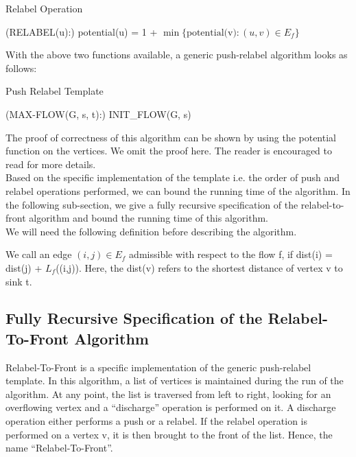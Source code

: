 \documentclass[BTech]{iitmdiss}
\begin{document}
	    \begin{algorithm}[H]
	      \caption{Relabel Operation}
	      
	      \Begin(RELABEL{(u)}:){
		potential(u) =  1 + $\min \{\text{potential(v)} : (u,v) \in E_f \}$ \;
	      }
	    \end{algorithm}
	    
	    With the above two functions available, a generic push-relabel algorithm looks as follows:
	    
	    \begin{algorithm}[H]
	      \caption{Push Relabel Template}
	      
	      \Begin(MAX-FLOW{(G, s, t)}:)
	      {
		INIT\_FLOW(G, s) \;
	      }
	    \end{algorithm}

	    The proof of correctness of this algorithm can be shown by using the potential function on the vertices. We omit the proof here. The 
	    reader is encouraged to read \cite{clrs} for more details. \\
	    	    
	    Based on the specific implementation of the template i.e. the order of push and relabel operations performed, we can bound the running time 
	    of the algorithm. In the following sub-section, we give a fully recursive specification of the relabel-to-front algorithm and bound the 
	    running time of this algorithm. \\
	    
	    We will need the following definition before describing the algorithm.
	    
	    \begin{defn}
	       We call an edge $(i, j) \in E_f$ admissible with respect to the flow f, if dist(i) = dist(j) + $L_f$((i,j)). Here,
	    the dist(v) refers to the shortest distance of vertex v to sink t. \\
	    \end{defn}

	    
	    
	    
	    \subsection{Fully Recursive Specification of the Relabel-To-Front Algorithm}
	      Relabel-To-Front is a specific implementation of the generic push-relabel template. In this algorithm, a list of vertices is maintained during
	      the run of the algorithm. At any point, the list is traversed from left to right, looking for an overflowing vertex and a ``discharge''
	      operation is performed on it. A discharge operation either performs a push or a relabel. If the relabel operation is performed on a vertex v,
	      it is then brought to the front of the list. Hence, the name ``Relabel-To-Front''. \\
	      
\end{document}

